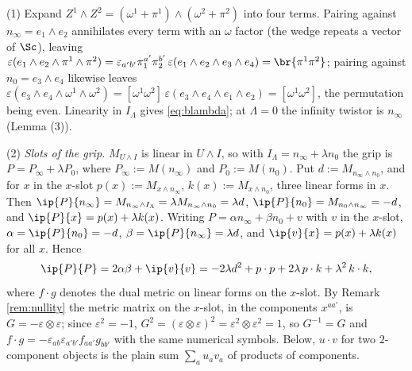 (1) Expand $Z^{1}\wedge Z^{2} = (\omega^{1} + \pi^{1})\wedge(\omega^{2} + \pi^{2})$ into four terms. Pairing against $n_{\infty} = e_{1}\wedge e_{2}$ annihilates every term with an $\omega$ factor (the wedge repeats a vector of $\Sc$), leaving $\varepsilon(e_{1}\wedge e_{2}\wedge\pi^{1}\wedge\pi^{2}) = \varepsilon_{a'b'}\pi_{1}^{a'}\pi_{2}^{b'}\,\varepsilon(e_{1}\wedge e_{2}\wedge e_{3}\wedge e_{4}) = \br{\pi^{1}\pi^{2}}$; pairing against $n_{0} = e_{3}\wedge e_{4}$ likewise leaves $\varepsilon(e_{3}\wedge e_{4}\wedge\omega^{1}\wedge\omega^{2}) = [\omega^{1}\omega^{2}]\,\varepsilon(e_{3}\wedge e_{4}\wedge e_{1}\wedge e_{2}) = [\omega^{1}\omega^{2}]$, the permutation being even. Linearity in $I_{\Lambda}$ gives \eqref{eq:blambda}; at $\Lambda = 0$ the infinity twistor is $n_{\infty}$ (Lemma (3)).

(2) \emph{Slots of the grip.} $M_{U\wedge I}$ is linear in $U \wedge I$, so with $I_{\Lambda} = n_{\infty} + \lambda n_{0}$ the grip is $P = P_{\infty} + \lambda P_{0}$, where $P_{\infty} := M(n_{\infty})$ and $P_{0} := M(n_{0})$. Put $d := M_{n_{\infty}\wedge n_{0}}$, and for $x$ in the $x$-slot $p(x) := M_{x\wedge n_{\infty}}$, $k(x) := M_{x\wedge n_{0}}$, three linear forms in $x$. Then $\ip{P}{n_{\infty}} = M_{n_{\infty}\wedge I_{\Lambda}} = \lambda M_{n_{\infty}\wedge n_{0}} = \lambda d$, $\ip{P}{n_{0}} = M_{n_{0}\wedge n_{\infty}} = -d$, and $\ip{P}{x} = p(x) + \lambda k(x)$. Writing $P = \alpha n_{\infty} + \beta n_{0} + v$ with $v$ in the $x$-slot, $\alpha = \ip{P}{n_{0}} = -d$, $\beta = \ip{P}{n_{\infty}} = \lambda d$, and $\ip{v}{x} = p(x) + \lambda k(x)$ for all $x$. Hence
\[
\ip{P}{P} = 2\alpha\beta + \ip{v}{v} = -2\lambda d^{2} + p\cdot p + 2\lambda\, p\cdot k + \lambda^{2}\, k\cdot k,
\]
where $f \cdot g$ denotes the dual metric on linear forms on the $x$-slot. By Remark \ref{rem:nullity} the metric matrix on the $x$-slot, in the components $x^{aa'}$, is $G = -\varepsilon\otimes\varepsilon$; since $\varepsilon^{2} = -1$, $G^{2} = (\varepsilon\otimes\varepsilon)^{2} = \varepsilon^{2}\otimes\varepsilon^{2} = 1$, so $G^{-1} = G$ and $f\cdot g = -\varepsilon_{ab}\varepsilon_{a'b'}f_{aa'}g_{bb'}$ with the same numerical symbols. Below, $u\cdot v$ for two $2$-component objects is the plain sum $\sum_{a}u_{a}v_{a}$ of products of components.

